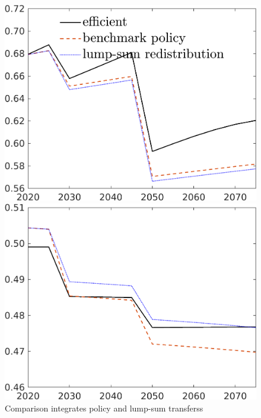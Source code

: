 \begin{figure}[h!!]
	\centering
	\caption{Comparison integrates policy and lump-sum transferss}\label{fig:bench_lumpsum}
	
	\begin{minipage}[]{0.32\textwidth}
		\includegraphics[width=1\textwidth]{../../codding_model/own_basedOnFried/optimalPol_190722_tidiedUp/figures/all_July22/C_CompEffOPT_T_NoTaus_pol4_spillover0_noskill0_sep1_xgrowth0_etaa0.79_lgd1_lff0.png}
	\end{minipage}
	\begin{minipage}[]{0.32\textwidth}
		\includegraphics[width=1\textwidth]{../../codding_model/own_basedOnFried/optimalPol_190722_tidiedUp/figures/all_July22/hh_CompEffOPT_T_NoTaus_pol4_spillover0_noskill0_sep1_xgrowth0_etaa0.79_lgd0_lff0.png}

\end{minipage}
\end{figure}
